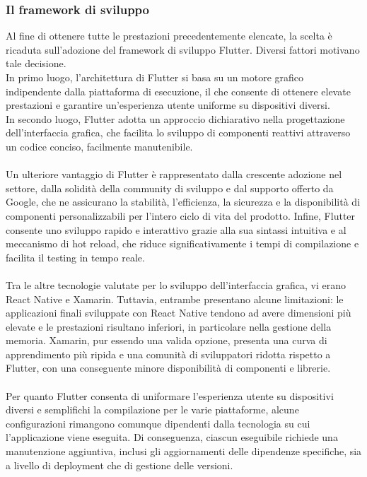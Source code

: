 \subsubsection{Il framework di sviluppo}
Al fine di ottenere tutte le prestazioni precedentemente elencate, la scelta è ricaduta sull’adozione del framework di sviluppo Flutter.
Diversi fattori motivano tale decisione. \\
In primo luogo, l'architettura di Flutter si basa su un motore grafico indipendente dalla piattaforma di esecuzione,
il che consente di ottenere elevate prestazioni e garantire un'esperienza utente uniforme su dispositivi diversi. \\
In secondo luogo, Flutter adotta un approccio dichiarativo nella progettazione dell'interfaccia grafica,
che facilita lo sviluppo di componenti reattivi attraverso un codice conciso, facilmente manutenibile.\\
\\
Un ulteriore vantaggio di Flutter è rappresentato dalla crescente adozione nel settore,
dalla solidità della community di sviluppo e dal supporto offerto da Google,
che ne assicurano la stabilità, l'efficienza, la sicurezza e la disponibilità di componenti personalizzabili per l'intero ciclo di vita del prodotto.
Infine, Flutter consente uno sviluppo rapido e interattivo grazie alla sua sintassi intuitiva e al meccanismo di hot reload,
che riduce significativamente i tempi di compilazione e facilita il testing in tempo reale.\\
\\
Tra le altre tecnologie valutate per lo sviluppo dell'interfaccia grafica, vi erano React Native e Xamarin.
Tuttavia, entrambe presentano alcune limitazioni: 
le applicazioni finali sviluppate con React Native tendono ad avere dimensioni più elevate e le prestazioni risultano inferiori,
in particolare nella gestione della memoria.
Xamarin, pur essendo una valida opzione, presenta una curva di apprendimento più ripida e 
una comunità di sviluppatori ridotta rispetto a Flutter,
con una conseguente minore disponibilità di componenti e librerie.\\
\\
Per quanto Flutter consenta di uniformare l'esperienza utente su dispositivi diversi e semplifichi la compilazione per le varie piattaforme,
alcune configurazioni rimangono comunque dipendenti dalla tecnologia su cui l'applicazione viene eseguita.
Di conseguenza, ciascun eseguibile richiede una manutenzione aggiuntiva, inclusi gli aggiornamenti delle dipendenze specifiche,
sia a livello di deployment che di gestione delle versioni.\\
\\

